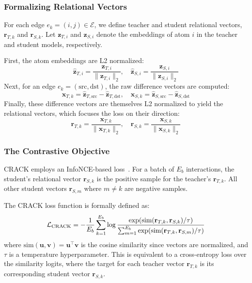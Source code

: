 \documentclass{article}
\begin{document}
\subsubsection{Formalizing Relational Vectors}

For each edge $e_k = (i,j) \in \mathcal{E}$, we define teacher and student relational vectors, $\mathbf{r}_{T,k}$ and $\mathbf{r}_{S,k}$. Let $\mathbf{z}_{T,i}$ and $\mathbf{z}_{S,i}$ denote the embeddings of atom $i$ in the teacher and student models, respectively.

First, the atom embeddings are L2 normalized:
$$ \hat{\mathbf{z}}_{T,i} = \frac{\mathbf{z}_{T,i}}{\|\mathbf{z}_{T,i}\|_2}, \quad \hat{\mathbf{z}}_{S,i} = \frac{\mathbf{z}_{S,i}}{\|\mathbf{z}_{S,i}\|_2} $$
Next, for an edge $e_k = (\text{src}, \text{dst})$, the raw difference vectors are computed:
$$ \mathbf{x}_{T,k} = \hat{\mathbf{z}}_{T,\text{src}} - \hat{\mathbf{z}}_{T,\text{dst}}, \quad \mathbf{x}_{S,k} = \hat{\mathbf{z}}_{S,\text{src}} - \hat{\mathbf{z}}_{S,\text{dst}} $$
Finally, these difference vectors are themselves L2 normalized to yield the relational vectors, which focuses the loss on their direction:
$$ \mathbf{r}_{T,k} = \frac{\mathbf{x}_{T,k}}{\|\mathbf{x}_{T,k}\|_2}, \quad \mathbf{r}_{S,k} = \frac{\mathbf{x}_{S,k}}{\|\mathbf{x}_{S,k}\|_2} $$


\subsubsection{The Contrastive Objective}

CRACK employs an InfoNCE-based loss~\citep{oord2018representation}. For a batch of $E_b$ interactions, the student's relational vector $\mathbf{r}_{S,k}$ is the positive sample for the teacher's $\mathbf{r}_{T,k}$. All other student vectors $\mathbf{r}_{S,m}$ where $m \neq k$ are negative samples.

The CRACK loss function is formally defined as:
$$ \mathcal{L}_{\text{CRACK}} = - \frac{1}{E_b} \sum_{k=1}^{E_b} \log \frac{\exp(\text{sim}(\mathbf{r}_{T,k}, \mathbf{r}_{S,k}) / \tau)}{\sum_{m=1}^{E_b} \exp(\text{sim}(\mathbf{r}_{T,k}, \mathbf{r}_{S,m}) / \tau)} $$
where $\text{sim}(\mathbf{u}, \mathbf{v}) = \mathbf{u}^\top \mathbf{v}$ is the cosine similarity since vectors are normalized, and $\tau$ is a temperature hyperparameter. This is equivalent to a cross-entropy loss over the similarity logits, where the target for each teacher vector $\mathbf{r}_{T,k}$ is its corresponding student vector $\mathbf{r}_{S,k}$.
\end{document}
